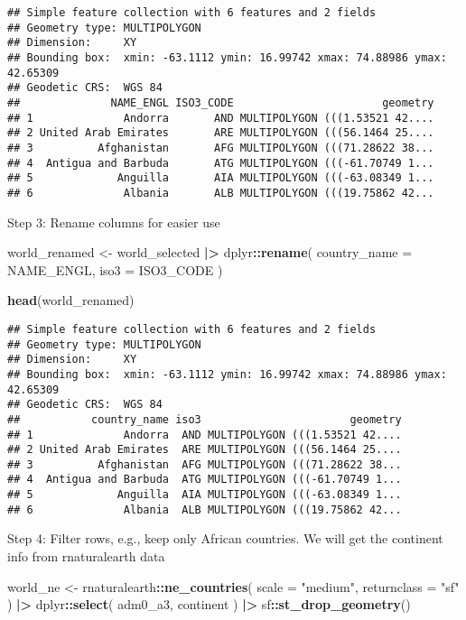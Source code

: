\documentclass[
]{article}
\newenvironment{Shaded}{\begin{snugshade}}{\end{snugshade}}
\newcommand{\AttributeTok}[1]{\textcolor[rgb]{0.13,0.29,0.53}{#1}}
\newcommand{\FunctionTok}[1]{\textcolor[rgb]{0.13,0.29,0.53}{\textbf{#1}}}
\newcommand{\NormalTok}[1]{#1}
\newcommand{\OtherTok}[1]{\textcolor[rgb]{0.56,0.35,0.01}{#1}}
\newcommand{\SpecialCharTok}[1]{\textcolor[rgb]{0.81,0.36,0.00}{\textbf{#1}}}
\newcommand{\StringTok}[1]{\textcolor[rgb]{0.31,0.60,0.02}{#1}}
\begin{document}
\begin{verbatim}
## Simple feature collection with 6 features and 2 fields
## Geometry type: MULTIPOLYGON
## Dimension:     XY
## Bounding box:  xmin: -63.1112 ymin: 16.99742 xmax: 74.88986 ymax: 42.65309
## Geodetic CRS:  WGS 84
##              NAME_ENGL ISO3_CODE                       geometry
## 1              Andorra       AND MULTIPOLYGON (((1.53521 42....
## 2 United Arab Emirates       ARE MULTIPOLYGON (((56.1464 25....
## 3          Afghanistan       AFG MULTIPOLYGON (((71.28622 38...
## 4  Antigua and Barbuda       ATG MULTIPOLYGON (((-61.70749 1...
## 5             Anguilla       AIA MULTIPOLYGON (((-63.08349 1...
## 6              Albania       ALB MULTIPOLYGON (((19.75862 42...
\end{verbatim}

Step 3: Rename columns for easier use

\begin{Shaded}
\begin{Highlighting}[]
\NormalTok{world\_renamed }\OtherTok{\textless{}{-}}\NormalTok{ world\_selected }\SpecialCharTok{|\textgreater{}} 
\NormalTok{  dplyr}\SpecialCharTok{::}\FunctionTok{rename}\NormalTok{(}
    \AttributeTok{country\_name =}\NormalTok{ NAME\_ENGL,}
    \AttributeTok{iso3 =}\NormalTok{ ISO3\_CODE}
\NormalTok{  )}

\FunctionTok{head}\NormalTok{(world\_renamed)}
\end{Highlighting}
\end{Shaded}

\begin{verbatim}
## Simple feature collection with 6 features and 2 fields
## Geometry type: MULTIPOLYGON
## Dimension:     XY
## Bounding box:  xmin: -63.1112 ymin: 16.99742 xmax: 74.88986 ymax: 42.65309
## Geodetic CRS:  WGS 84
##           country_name iso3                       geometry
## 1              Andorra  AND MULTIPOLYGON (((1.53521 42....
## 2 United Arab Emirates  ARE MULTIPOLYGON (((56.1464 25....
## 3          Afghanistan  AFG MULTIPOLYGON (((71.28622 38...
## 4  Antigua and Barbuda  ATG MULTIPOLYGON (((-61.70749 1...
## 5             Anguilla  AIA MULTIPOLYGON (((-63.08349 1...
## 6              Albania  ALB MULTIPOLYGON (((19.75862 42...
\end{verbatim}

Step 4: Filter rows, e.g., keep only African countries. We will get the
continent info from rnaturalearth data

\begin{Shaded}
\begin{Highlighting}[]
\NormalTok{world\_ne }\OtherTok{\textless{}{-}}\NormalTok{ rnaturalearth}\SpecialCharTok{::}\FunctionTok{ne\_countries}\NormalTok{(}
  \AttributeTok{scale =} \StringTok{"medium"}\NormalTok{,}
  \AttributeTok{returnclass =} \StringTok{"sf"}
\NormalTok{) }\SpecialCharTok{|\textgreater{}} 
\NormalTok{  dplyr}\SpecialCharTok{::}\FunctionTok{select}\NormalTok{(}
\NormalTok{    adm0\_a3,}
\NormalTok{    continent}
\NormalTok{  ) }\SpecialCharTok{|\textgreater{}} 
\NormalTok{  sf}\SpecialCharTok{::}\FunctionTok{st\_drop\_geometry}\NormalTok{()}
\end{Highlighting}
\end{Shaded}
\end{document}
